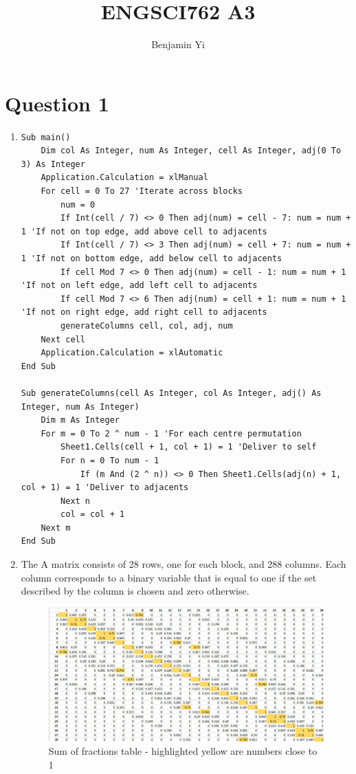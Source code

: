 \documentclass[10pt,a4paper]{article}
\begin{document}
\title{ENGSCI762 A3}
\author{Benjamin Yi}

\section*{Question 1}
\begin{enumerate}
\item
\begin{lstlisting}[language=VBscript]
Sub main()
	Dim col As Integer, num As Integer, cell As Integer, adj(0 To 3) As Integer
	Application.Calculation = xlManual
	For cell = 0 To 27 'Iterate across blocks
		num = 0
		If Int(cell / 7) <> 0 Then adj(num) = cell - 7: num = num + 1 'If not on top edge, add above cell to adjacents
		If Int(cell / 7) <> 3 Then adj(num) = cell + 7: num = num + 1 'If not on bottom edge, add below cell to adjacents
		If cell Mod 7 <> 0 Then adj(num) = cell - 1: num = num + 1 'If not on left edge, add left cell to adjacents
		If cell Mod 7 <> 6 Then adj(num) = cell + 1: num = num + 1 'If not on right edge, add right cell to adjacents
		generateColumns cell, col, adj, num
	Next cell
	Application.Calculation = xlAutomatic
End Sub

Sub generateColumns(cell As Integer, col As Integer, adj() As Integer, num As Integer)
	Dim m As Integer
	For m = 0 To 2 ^ num - 1 'For each centre permutation
		Sheet1.Cells(cell + 1, col + 1) = 1 'Deliver to self
		For n = 0 To num - 1
			If (m And (2 ^ n)) <> 0 Then Sheet1.Cells(adj(n) + 1, col + 1) = 1 'Deliver to adjacents
		Next n
		col = col + 1
	Next m
End Sub
\end{lstlisting}

\item 
The A matrix consists of 28 rows, one for each block, and 288 columns. Each column corresponds to a binary variable that is equal to one if the set described by the column is chosen and zero otherwise.

\begin{figure}[H]
	\centering
	\includegraphics[width=1\linewidth]{texstudio_Thursday-31-May-21'04'00}
	\caption{Sum of fractions table - highlighted yellow are numbers close to 1}
	\label{fig:texstudiothursday-31-may-210400}
\end{figure}


\end{enumerate}
\end{document}
